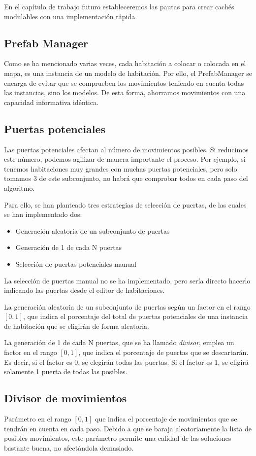 En el capítulo de trabajo futuro estableceremos las pautas para crear cachés modulables con una implementación rápida.

\subsection{Prefab Manager}

Como se ha mencionado varias veces, cada habitación a colocar o colocada en el mapa, es una instancia de un modelo de habitación. Por ello, el PrefabManager se encarga de evitar que se comprueben los movimientos teniendo en cuenta todas las instancias, sino los modelos. De esta forma, ahorramos movimientos con una capacidad informativa idéntica.


\subsection{Puertas potenciales}

Las puertas potenciales afectan al número de movimientos posibles. Si reducimos este número, podemos agilizar de manera importante el proceso. Por ejemplo, si tenemos habitaciones muy grandes con muchas puertas potenciales, pero solo tomamos 3 de este subconjunto, no habrá que comprobar todos en cada paso del algoritmo.

Para ello, se han planteado tres estrategias de selección de puertas, de las cuales se han implementado dos:

\begin{itemize}
	\item Generación aleatoria de un subconjunto de puertas
	\item Generación de 1 de cada N puertas
	\item Selección de puertas potenciales manual
\end{itemize}

La selección de puertas manual no se ha implementado, pero sería directo hacerlo indicando las puertas desde el editor de habitaciones.

La generación aleatoria de un subconjunto de puertas según un factor en el rango $[0,1]$, que indica el porcentaje del total de puertas potenciales de una instancia de habitación que se eligirán de forma aleatoria.

La generación de 1 de cada N puertas, que se ha llamado \emph{divisor}, emplea un factor en el rango $[0,1]$, que indica el porcentaje de puertas que se descartarán. Es decir, si el factor es 0, se elegirán todas las puertas. Si el factor es 1, se eligirá solamente 1 puerta de todas las posibles.

\subsection{Divisor de movimientos}

Parámetro en el rango $[0,1]$ que indica el porcentaje de movimientos que se tendrán en cuenta en cada paso. Debido a que se baraja aleatoriamente la lista de posibles movimientos, este parámetro permite una calidad de las soluciones bastante buena, no afectándola demasiado.

